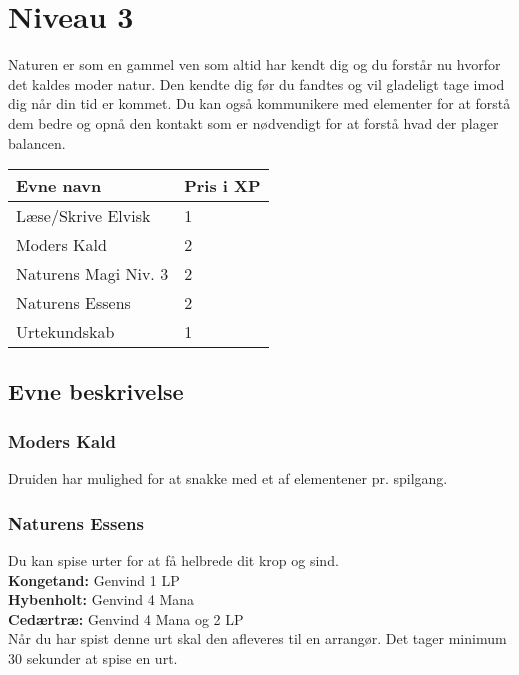 \chapter*{Niveau 3}

Naturen er som en gammel ven som altid har kendt dig og du forstår nu hvorfor det kaldes moder natur. Den kendte dig før du fandtes og vil gladeligt tage imod dig når din tid er kommet.
Du kan også kommunikere med elementer for at forstå dem bedre og opnå den kontakt som er nødvendigt for at forstå hvad der plager balancen.


\begin{table}[H]
    \centering
    \begin{tabular}{|p{}|p{}|}
    \rowcolor{cerulean!80}\hline
        Evne navn & Pris i XP \\\hline
    Læse/Skrive Elvisk & 1\\\hline
    Moders Kald & 2\\\hline
    Naturens Magi Niv. 3 & 2\\\hline
    Naturens Essens & 2 \\\hline
    Urtekundskab & 1\\\hline
    \end{tabular}
\end{table}
\section*{Evne beskrivelse}



\subsection*{Moders Kald}
Druiden har mulighed for at snakke med et af elementener pr. spilgang.

\subsection*{Naturens Essens}
Du kan spise urter for at få helbrede dit krop og sind.\\
\textbf{Kongetand:} Genvind 1 LP\\
\textbf{Hybenholt:} Genvind 4 Mana\\
\textbf{Cedærtræ:} Genvind 4 Mana og 2 LP\\
Når du har spist denne urt skal den afleveres til en arrangør. Det tager minimum 30 sekunder at spise en urt.

